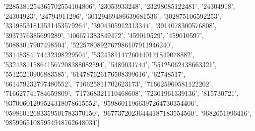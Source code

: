 \documentclass[11pt,a4paper]{article}
\begin{document}
\begin{pycode}
 '2285381254365702554104806',
 '23053933248',
 '23298085122481',
 '24304918',
 '24304923',
 '24794911296',
 '30129469486639681536',
 '302875106592253',
 '33198531813531453579264',
 '3904305912313344',
 '3914078300576808',
 '3937376385699289',
 '406671383849472',
 '459010529',
 '459010597',
 '50883017907498504',
 '5225780892767986107911946240',
 '53148384174432398229504',
 '5324381147260440171849078882',
 '5324381158641567208388082594',
 '5489031744',
 '55125062438663321',
 '55125210906883585',
 '614787626176508399616',
 '62748517',
 '661479232797480552',
 '716625811702623173',
 '716625960581122202',
 '716627741784659809',
 '717368321110468608',
 '72301961339136',
 '815730721',
 '93700601299524318078615552',
 '95986011966397264730354406',
 '95986012683359501783370150',
 '96773720236444187183554560',
 '9682651996416',
 '98599651085954948762648034']
\end{pycode}
\end{document}
